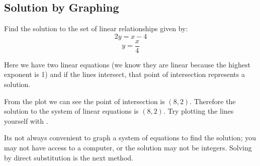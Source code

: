  \subsection*{Solution by Graphing}
 \example Find the solution to the set of linear relationships given by:
 $$2y=x-4$$
 $$y=\frac{x}{4}$$
  \begin{multicols}{2}
 \solution Here we have two linear equations (we know they are linear because the highest exponent is 1) and if the lines intersect, that point of intersection represents a solution. 
 	
 	From the plot we can see the point of intersection is $(8,2)$. Therefore the solution to the system of linear equations is $(8,2)$. Try plotting the lines yourself with \desmos.
 	
 	
 	Its not always convenient to graph a system of equations to find the solution; you may not have access to a computer, or the solution may not be integers. Solving by direct substitution is the next method.
 	\columnbreak
 \begin{center}
\end{center}
\end{multicols}


